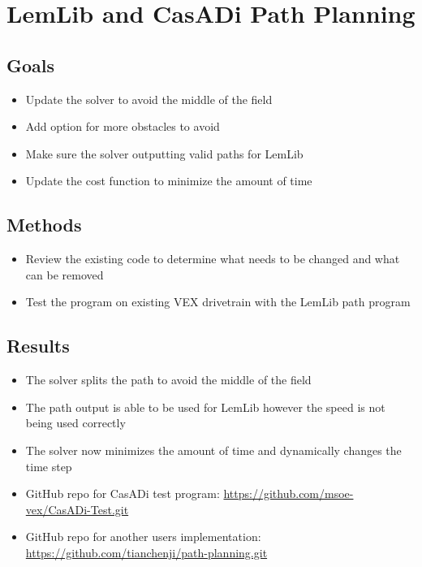 \section{LemLib and CasADi Path Planning}

\subsection{Goals}
\begin{itemize}
    \item Update the solver to avoid the middle of the field
    \item Add option for more obstacles to avoid
    \item Make sure the solver outputting valid paths for LemLib
    \item Update the cost function to minimize the amount of time
\end{itemize}

\subsection{Methods}
\begin{itemize}
    \item Review the existing code to determine what needs to be changed and what can be removed
    \item Test the program on existing VEX drivetrain with the LemLib path program
\end{itemize}

\subsection{Results}
\begin{itemize}
    \item The solver splits the path to avoid the middle of the field
    \item The path output is able to be used for LemLib however the speed is not being used correctly
    \item The solver now minimizes the amount of time and dynamically changes the time step
    \item GitHub repo for CasADi test program: \href{https://github.com/msoe-vex/CasADi-Test.git}{https://github.com/msoe-vex/CasADi-Test.git}
    \item GitHub repo for another users implementation: \href{https://github.com/tianchenji/path-planning.git}{https://github.com/tianchenji/path-planning.git}
\end{itemize}

